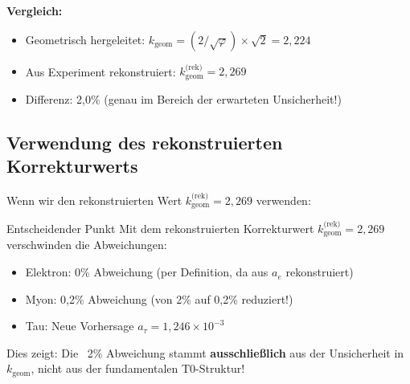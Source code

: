 	\textbf{Vergleich:}
	\begin{itemize}
		\item Geometrisch hergeleitet: $k_{\text{geom}} = (2/\sqrt{\varphi}) \times \sqrt{2} = 2{,}224$
		\item Aus Experiment rekonstruiert: $k_{\text{geom}}^{\text{(rek)}} = 2{,}269$
		\item Differenz: 2{,}0\% (genau im Bereich der erwarteten Unsicherheit!)
	\end{itemize}
	
	\subsection{Verwendung des rekonstruierten Korrekturwerts}
	
	Wenn wir den rekonstruierten Wert $k_{\text{geom}}^{\text{(rek)}} = 2{,}269$ verwenden:
	
	\begin{table}[h]
		\centering
		\caption{Absolutwerte mit geometrischem vs. rekonstruiertem $k_{\text{geom}}$}
	\end{table}
	
	\begin{important}{Entscheidender Punkt}
		Mit dem rekonstruierten Korrekturwert $k_{\text{geom}}^{\text{(rek)}} = 2{,}269$ verschwinden die Abweichungen:
		\begin{itemize}
			\item Elektron: 0\% Abweichung (per Definition, da aus $a_e$ rekonstruiert)
			\item Myon: 0{,}2\% Abweichung (von 2\% auf 0{,}2\% reduziert!)
			\item Tau: Neue Vorhersage $a_\tau = 1{,}246 \times 10^{-3}$
		\end{itemize}
		
		Dies zeigt: Die ~2\% Abweichung stammt \textbf{ausschließlich} aus der Unsicherheit in $k_{\text{geom}}$, nicht aus der fundamentalen T0-Struktur!
	\end{important}
	
